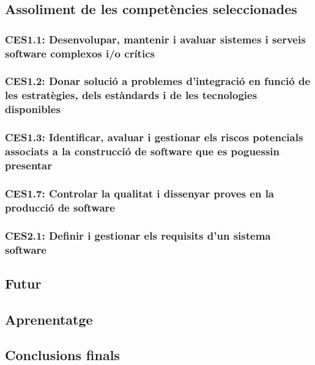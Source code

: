 \documentclass[a4paper]{article}
\begin{document}
\subsection{Assoliment de les competències seleccionades}
\subsubsection*{CES1.1: Desenvolupar, mantenir i avaluar sistemes i serveis software complexos i/o crítics}
\subsubsection*{CES1.2: Donar solució a problemes d'integració en funció de les estratègies, dels estàndards i de les tecnologies disponibles}
\subsubsection*{CES1.3: Identificar, avaluar i gestionar els riscos potencials associats a la construcció de software que es poguessin presentar}
\subsubsection*{CES1.7: Controlar la qualitat i dissenyar proves en la producció de software}
\subsubsection*{CES2.1: Definir i gestionar els requisits d'un sistema software}

\subsection{Futur}

\subsection{Aprenentatge}

\subsection{Conclusions finals}


\newpage
\nocite{*}
\printbibliography[heading=bibintoc]
\end{document}
